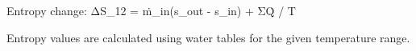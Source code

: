 Entropy change:  
ΔS_12 = ṁ_in(s_out - s_in) + ΣQ̇ / T  

Entropy values are calculated using water tables for the given temperature range.